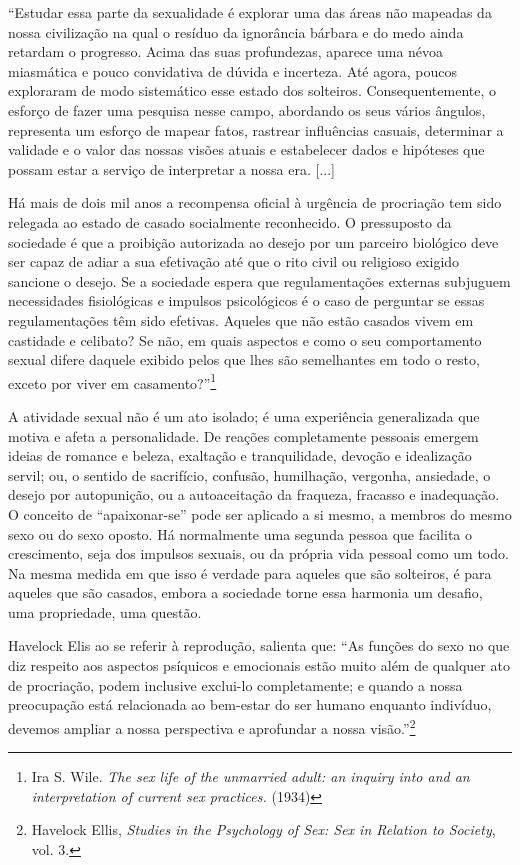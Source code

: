 ``Estudar essa parte da sexualidade é explorar uma das áreas não
mapeadas da nossa civilização na qual o resíduo da ignorância bárbara e
do medo ainda retardam o progresso. Acima das suas profundezas, aparece
uma névoa miasmática e pouco convidativa de dúvida e incerteza. Até
agora, poucos exploraram de modo sistemático esse estado dos solteiros.
Consequentemente, o esforço de fazer uma pesquisa nesse campo, abordando
os seus vários ângulos, representa um esforço de mapear fatos, rastrear
influências casuais, determinar a validade e o valor das nossas visões
atuais e estabelecer dados e hipóteses que possam estar a serviço de
interpretar a nossa era. {[}...{]}

Há mais de dois mil anos a recompensa oficial à urgência de procriação
tem sido relegada ao estado de casado socialmente reconhecido. O
pressuposto da sociedade é que a proibição autorizada ao desejo por um
parceiro biológico deve ser capaz de adiar a sua efetivação até que o
rito civil ou religioso exigido sancione o desejo. Se a sociedade espera
que regulamentações externas subjuguem necessidades fisiológicas e
impulsos psicológicos é o caso de perguntar se essas regulamentações têm
sido efetivas. Aqueles que não estão casados vivem em castidade e
celibato? Se não, em quais aspectos e como o seu comportamento sexual
difere daquele exibido pelos que lhes são semelhantes em todo o resto,
exceto por viver em casamento?''\footnote{Ira S. Wile. \emph{The sex
  life of the unmarried adult: an inquiry into and an interpretation of
  current sex practices.} (1934)}

A atividade sexual não é um ato isolado; é uma experiência generalizada
que motiva e afeta a personalidade. De reações completamente pessoais
emergem ideias de romance e beleza, exaltação e tranquilidade, devoção e
idealização servil; ou, o sentido de sacrifício, confusão, humilhação,
vergonha, ansiedade, o desejo por autopunição, ou a autoaceitação da
fraqueza, fracasso e inadequação. O conceito de ``apaixonar-se'' pode
ser aplicado a si mesmo, a membros do mesmo sexo ou do sexo oposto. Há
normalmente uma segunda pessoa que facilita o crescimento, seja dos
impulsos sexuais, ou da própria vida pessoal como um todo. Na mesma
medida em que isso é verdade para aqueles que são solteiros, é para
aqueles que são casados, embora a sociedade torne essa harmonia um
desafio, uma propriedade, uma questão.

Havelock Elis ao se referir à reprodução, salienta que: ``As funções do
sexo no que diz respeito aos aspectos psíquicos e emocionais estão muito
além de qualquer ato de procriação, podem inclusive exclui-lo
completamente; e quando a nossa preocupação está relacionada ao
bem-estar do ser humano enquanto indivíduo, devemos ampliar a nossa
perspectiva e aprofundar a nossa visão.''\footnote{Havelock Ellis,
  \emph{Studies in the Psychology of Sex: Sex in Relation to Society},
  vol. 3.}

